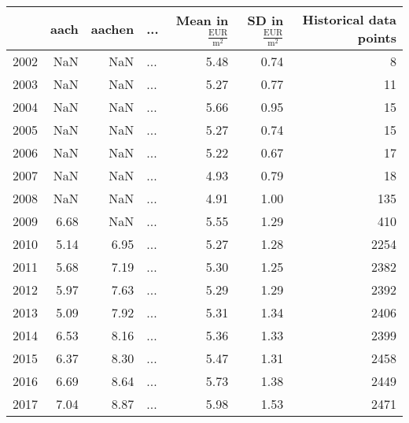 \begin{tabular}{lrrlrrr}
\toprule
{} &  aach &  aachen &  ... &  Mean in $\mathrm{\frac{EUR}{m^2}}$ &  SD in $\mathrm{\frac{EUR}{m^2}}$ &  Historical data points \\
\midrule
2002 &   NaN &     NaN &  ... &                                5.48 &                              0.74 &                       8 \\
2003 &   NaN &     NaN &  ... &                                5.27 &                              0.77 &                      11 \\
2004 &   NaN &     NaN &  ... &                                5.66 &                              0.95 &                      15 \\
2005 &   NaN &     NaN &  ... &                                5.27 &                              0.74 &                      15 \\
2006 &   NaN &     NaN &  ... &                                5.22 &                              0.67 &                      17 \\
2007 &   NaN &     NaN &  ... &                                4.93 &                              0.79 &                      18 \\
2008 &   NaN &     NaN &  ... &                                4.91 &                              1.00 &                     135 \\
\vspace{0.3cm}
2009 &  6.68 &     NaN &  ... &                                5.55 &                              1.29 &                     410 \\
2010 &  5.14 &    6.95 &  ... &                                5.27 &                              1.28 &                    2254 \\
2011 &  5.68 &    7.19 &  ... &                                5.30 &                              1.25 &                    2382 \\
2012 &  5.97 &    7.63 &  ... &                                5.29 &                              1.29 &                    2392 \\
2013 &  5.09 &    7.92 &  ... &                                5.31 &                              1.34 &                    2406 \\
2014 &  6.53 &    8.16 &  ... &                                5.36 &                              1.33 &                    2399 \\
2015 &  6.37 &    8.30 &  ... &                                5.47 &                              1.31 &                    2458 \\
2016 &  6.69 &    8.64 &  ... &                                5.73 &                              1.38 &                    2449 \\
2017 &  7.04 &    8.87 &  ... &                                5.98 &                              1.53 &                    2471 \\
\bottomrule
\end{tabular}
